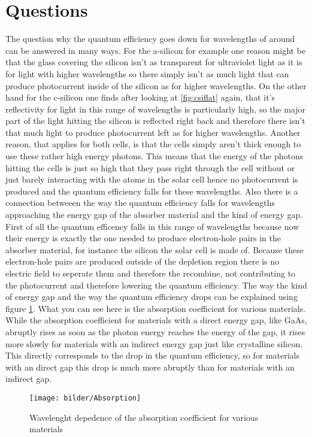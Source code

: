 \section{Questions}
The question why the quantum efficiency goes down for wavelengths of around can be answered in many ways. \newline
For the a-silicon for example one reason might be that the glass covering the silicon isn't as transparent for ultraviolet light as it is for light with higher wavelengths so there simply isn't as much light that can produce photocurrent inside of the silicon as for higher wavelengths. \newline
On the other hand for the c-silicon one finds after looking at \ref{fig:csiflat} again, that it's reflectivity for light in this range of wavelengths is particularly high, so the major part of the light hitting the silicon is reflected right back and therefore there isn't that much light to produce photocurrent left as for higher wavelengths. 
Another reason, that applies for both cells, is that the cells simply aren't thick enough to use these rather high energy photons. This means that the energy of the photons hitting the cells is just so high that they pass right through the cell without or just barely interacting with the atoms in the solar cell hence no photocurrent is produced and the quantum efficiency falls for these wavelengths. \newline
Also there is a connection betweeen the way the quantum efficiency falls for wavelengths approaching the energy gap of the absorber material and the kind of energy gap. First of all the quantum efficency falls in this range of wavelengths because now their energy is exactly the one needed to produce electron-hole pairs in the absorber material, for instance the silicon the solar cell is made of. Because these electron-hole pairs are produced outside of the depletion region there is no electric field to seperate them and therefore the recombine, not contributing to the photocurrent and therefore lowering the quantum efficiency. The way the kind of energy gap and the way the quantum efficiency drops can be explained using figure \ref{fig:absorption}. What you can see here is the absorption coefficient for various materials. While the absorption coefficient for materials with a direct energy gap, like GaAs, abruptly rises as soon as the photon energy reaches the energy of the gap, it rises more slowly for materials with an indirect energy gap just like crystalline silicon. This directly corresponds to the drop in the quantum efficiency, so for materials with an direct gap this drop is much more abruptly than for materials with an indirect gap. 
\begin{figure}[h]
	\centering
	\texttt{[image: bilder/Absorption]}
	\caption{Wavelenght depedence of the absorption coefficient for various materials}
	\label{fig:absorption}
\end{figure}
